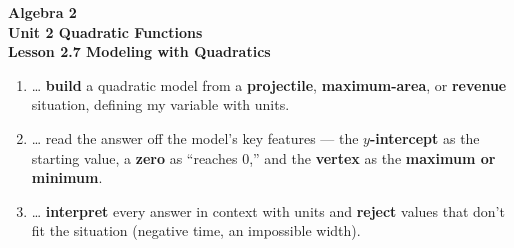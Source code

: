 \documentclass[10pt]{article}
\begin{document}
\vspace{-0.8in}

\begin{center}
  {\color{white}\textbf{\LARGE Algebra 2}}\\[4pt]
  {\color{forestmid}\large\textbf{Unit 2 \quad Quadratic Functions}}\\[6pt]
  {\color{white}\textbf{\large Lesson 2.7 \quad Modeling with Quadratics}}
\end{center}

\vspace{0.22in}
\namedateperiod
\vspace{0.18in}

\begin{learningtargetbox}
\small
\begin{enumerate}[leftmargin=1.5em, itemsep=5pt]
  \item \ldots{} \textbf{build} a quadratic model from a \textbf{projectile}, \textbf{maximum-area}, or \textbf{revenue} situation, defining my variable with units.
  \item \ldots{} read the answer off the model's key features --- the \textbf{$y$-intercept} as the starting value, a \textbf{zero} as ``reaches $0$,'' and the \textbf{vertex} as the \textbf{maximum or minimum}.
  \item \ldots{} \textbf{interpret} every answer in context with units and \textbf{reject} values that don't fit the situation (negative time, an impossible width).
\end{enumerate}
\end{learningtargetbox}

\vspace{0.14in}
\end{document}
